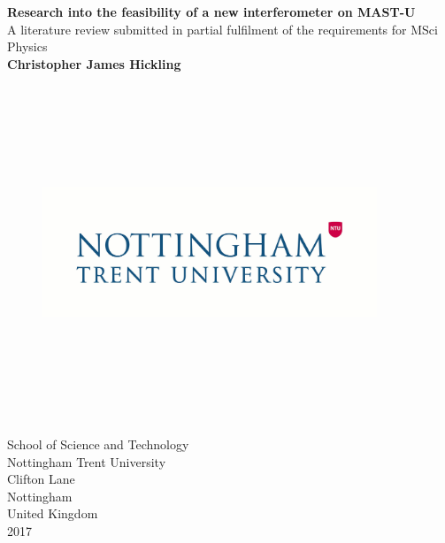 \documentclass[12pt,a4paper,oneside]{report}
\renewcommand{\baselinestretch}{1.5}
\begin{document}
\titleformat{\chapter}[display]
  {\normalfont\bfseries}{}{0pt}{\LARGE}


\begin{titlepage}
\renewcommand{\baselinestretch}{1}
\centering
\vspace{5cm}
\textbf{\LARGE{Research into the feasibility of a new interferometer on MAST-U}} \\
\vspace{0.75cm}
\large{A literature review submitted in partial fulfilment of the requirements for MSci Physics \\} 
\vspace{1.5cm}
\textbf{\Large{Christopher James Hickling}} \\
\vspace{9cm} 

\begin{figure}[H]
\centering      
\includegraphics[width=10cm, height=10cm, keepaspectratio]{Images/ntulogo.jpg}
\end{figure}    

\large{School of Science and Technology} \\
\large{Nottingham Trent University} \\
\large{Clifton Lane} \\
\large{Nottingham} \\
\large{United Kingdom} \\
\vspace{1cm}
\large{2017}
\end{titlepage}
\end{document}
